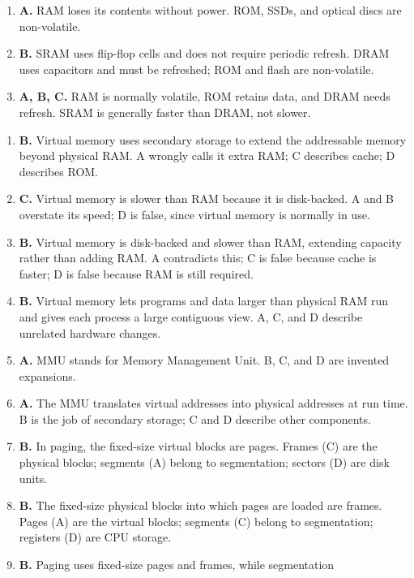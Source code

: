 \begin{enumerate}[label=\textbf{Q\arabic*.}, leftmargin=*]
\item \textbf{A.} RAM loses its contents without power. ROM, SSDs, and optical discs are non-volatile.

\item \textbf{B.} SRAM uses flip-flop cells and does not require periodic refresh. DRAM uses capacitors and must be refreshed; ROM and flash are non-volatile.

\item \textbf{A, B, C.} RAM is normally volatile, ROM retains data, and DRAM needs refresh. SRAM is generally faster than DRAM, not slower.

\end{enumerate}
\begin{enumerate}[label=\textbf{Q\arabic*.}, leftmargin=*]
\item \textbf{B.} Virtual memory uses secondary storage to extend the
  addressable memory beyond physical RAM. A wrongly calls it extra RAM; C
  describes cache; D describes ROM.
\item \textbf{C.} Virtual memory is slower than RAM because it is disk-backed.
  A and B overstate its speed; D is false, since virtual memory is normally in
  use.
\item \textbf{B.} Virtual memory is disk-backed and slower than RAM, extending
  capacity rather than adding RAM. A contradicts this; C is false because cache
  is faster; D is false because RAM is still required.
\item \textbf{B.} Virtual memory lets programs and data larger than physical
  RAM run and gives each process a large contiguous view. A, C, and D describe
  unrelated hardware changes.
\item \textbf{A.} MMU stands for Memory Management Unit. B, C, and D are
  invented expansions.
\item \textbf{A.} The MMU translates virtual addresses into physical addresses
  at run time. B is the job of secondary storage; C and D describe other
  components.
\item \textbf{B.} In paging, the fixed-size virtual blocks are pages. Frames
  (C) are the physical blocks; segments (A) belong to segmentation; sectors (D)
  are disk units.
\item \textbf{B.} The fixed-size physical blocks into which pages are loaded
  are frames. Pages (A) are the virtual blocks; segments (C) belong to
  segmentation; registers (D) are CPU storage.
\item \textbf{B.} Paging uses fixed-size pages and frames, while segmentation

\end{enumerate}
